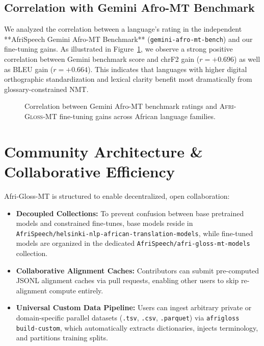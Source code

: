 \documentclass[10pt,twocolumn]{article}
\newcommand{\agm}{\textsc{Afri-Gloss-MT}}
\begin{document}
\subsection{Correlation with Gemini Afro-MT Benchmark}
We analyzed the correlation between a language's rating in the independent **AfriSpeech Gemini Afro-MT Benchmark** (\texttt{gemini-afro-mt-bench}) and our fine-tuning gains. As illustrated in Figure~\ref{fig:correlation}, we observe a strong positive correlation between Gemini benchmark score and chrF2 gain ($r = +0.696$) as well as BLEU gain ($r = +0.664$). This indicates that languages with higher digital orthographic standardization and lexical clarity benefit most dramatically from glossary-constrained NMT.

\begin{figure}[t]
\centering
\small
{}
\caption{Correlation between Gemini Afro-MT benchmark ratings and \agm{} fine-tuning gains across African language families.}
\label{fig:correlation}
\end{figure}

\section{Community Architecture & Collaborative Efficiency}

Afri-Gloss-MT is structured to enable decentralized, open collaboration:
\begin{itemize}
    \item \textbf{Decoupled Collections:} To prevent confusion between base pretrained models and constrained fine-tunes, base models reside in \texttt{AfriSpeech/helsinki-nlp-african-translation-models}, while fine-tuned models are organized in the dedicated \texttt{AfriSpeech/afri-gloss-mt-models} collection.
    \item \textbf{Collaborative Alignment Caches:} Contributors can submit pre-computed JSONL alignment caches via pull requests, enabling other users to skip re-alignment compute entirely.
    \item \textbf{Universal Custom Data Pipeline:} Users can ingest arbitrary private or domain-specific parallel datasets (\texttt{.tsv}, \texttt{.csv}, \texttt{.parquet}) via \texttt{afrigloss build-custom}, which automatically extracts dictionaries, injects terminology, and partitions training splits.
\end{itemize}
\end{document}
